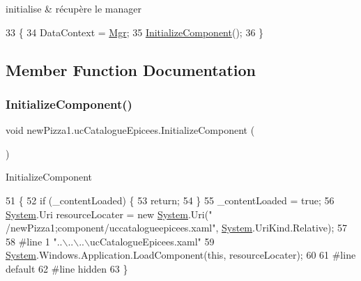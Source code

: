 initialise \& récupère le manager 


\begin{DoxyCode}
33         \{
34             DataContext = \hyperlink{classnewPizza1_1_1ucCatalogueEpicees_a30d96d36cd2657aa9b7315194c3c2f98}{Mgr};
35             \hyperlink{classnewPizza1_1_1ucCatalogueEpicees_a88c609f29d5b46d57c31019576f8d7d8}{InitializeComponent}();
36         \}
\end{DoxyCode}


\subsection{Member Function Documentation}
\mbox{\label{classnewPizza1_1_1ucCatalogueEpicees_a88c609f29d5b46d57c31019576f8d7d8}} 
\subsubsection{\texorpdfstring{Initialize\+Component()}{InitializeComponent()}\hspace{0.1cm}{\footnotesize\ttfamily [1/6]}}
{\footnotesize\ttfamily void new\+Pizza1.\+uc\+Catalogue\+Epicees.\+Initialize\+Component (\begin{DoxyParamCaption}{ }\end{DoxyParamCaption})\hspace{0.3cm}{\ttfamily [inline]}}



Initialize\+Component 


\begin{DoxyCode}
51                                           \{
52             \textcolor{keywordflow}{if} (\_contentLoaded) \{
53                 \textcolor{keywordflow}{return};
54             \}
55             \_contentLoaded = \textcolor{keyword}{true};
56             \hyperlink{namespaceSystem}{System}.Uri resourceLocater = \textcolor{keyword}{new} \hyperlink{namespaceSystem}{System}.Uri(\textcolor{stringliteral}{"
      /newPizza1;component/uccatalogueepicees.xaml"}, \hyperlink{namespaceSystem}{System}.UriKind.Relative);
57             
58 \textcolor{preprocessor}{            #line 1 "..\(\backslash\)..\(\backslash\)..\(\backslash\)ucCatalogueEpicees.xaml"}
59             \hyperlink{namespaceSystem}{System}.Windows.Application.LoadComponent(\textcolor{keyword}{this}, resourceLocater);
60             
61 \textcolor{preprocessor}{            #line default}
62 \textcolor{preprocessor}{            #line hidden}
63         \}
\end{DoxyCode}
\mbox{\label{classnewPizza1_1_1ucCatalogueEpicees_a88c609f29d5b46d57c31019576f8d7d8}} 
